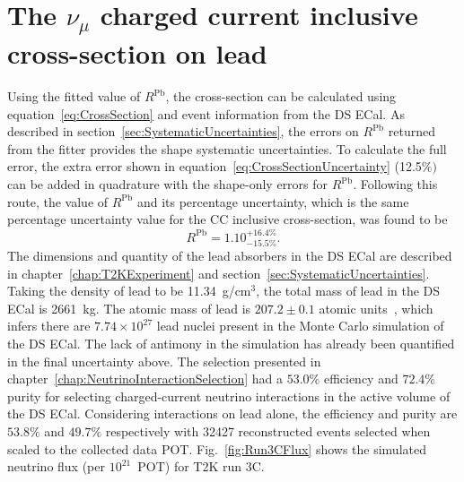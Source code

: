 \section{The $\nu_\mu$ charged current inclusive cross-section on lead}
\label{sec:PbCrossSection}
Using the fitted value of $R^{\textrm{Pb}}$, the cross-section can be calculated using equation~\ref{eq:CrossSection} and event information from the DS ECal.  As described in section~\ref{sec:SystematicUncertainties}, the errors on $R^{\textrm{Pb}}$ returned from the fitter provides the shape systematic uncertainties.  To calculate the full error, the extra error shown in equation~\ref{eq:CrossSectionUncertainty} (12.5$\%)$ can be added in quadrature with the shape-only errors for $R^{\textrm{Pb}}$.  Following this route, the value of $R^{\textrm{Pb}}$ and its percentage uncertainty, which is the same percentage uncertainty value for the CC inclusive cross-section, was found to be
\begin{equation}
R^{\textrm{Pb}} = 1.10^{+16.4\%}_{-15.5\%}.
\label{eq:RPbWithFullPercentageError}
\end{equation}
The dimensions and quantity of the lead absorbers in the DS ECal are described in chapter~\ref{chap:T2KExperiment} and section~\ref{sec:SystematicUncertainties}.  Taking the density of lead to be 11.34~g/cm$^{3}$, the total mass of lead in the DS ECal is 2661~kg.  The atomic mass of lead is $207.2\pm0.1$ atomic units~\cite{LeadAtomicUnits}, which infers there are $7.74\times10^{27}$ lead nuclei present in the Monte Carlo simulation of the DS ECal.  The lack of antimony in the simulation has already been quantified in the final uncertainty above.
\newline
\newline
The selection presented in chapter~\ref{chap:NeutrinoInteractionSelection} had a $53.0\%$ efficiency and $72.4\%$ purity for selecting charged-current neutrino interactions in the active volume of the DS ECal.  Considering interactions on lead alone, the efficiency and purity are $53.8\%$ and $49.7\%$ respectively with 32427 reconstructed events selected when scaled to the collected data POT.
\newline
\newline
Fig.~\ref{fig:Run3CFlux} shows the simulated neutrino flux (per $10^{21}$~POT) for T2K run 3C.  
